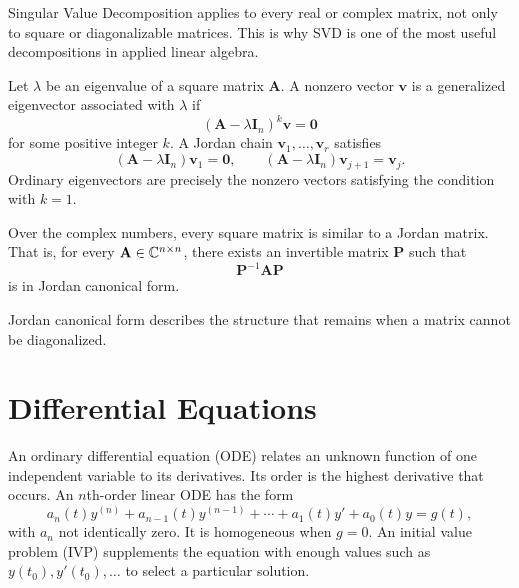     \begin{remark}
        Singular Value Decomposition applies to every real or complex matrix,
        not only to square or diagonalizable matrices. This is why SVD is one
        of the most useful decompositions in applied linear algebra.
    \end{remark}


    \begin{definition}
        Let $\lambda$ be an eigenvalue of a square matrix $\mathbf{A}$. A
        nonzero vector $\mathbf{v}$ is a generalized eigenvector associated
        with $\lambda$ if
        \[
            (\mathbf{A}-\lambda\mathbf{I}_n)^k\mathbf{v}
            =
            \mathbf{0}
        \]
        for some positive integer $k$. A Jordan chain
        $\mathbf{v}_1,\dots,\mathbf{v}_r$ satisfies
        \[
            (\mathbf{A}-\lambda\mathbf{I}_n)\mathbf{v}_1=\mathbf{0},
            \qquad
            (\mathbf{A}-\lambda\mathbf{I}_n)\mathbf{v}_{j+1}
            =
            \mathbf{v}_j.
        \]
        Ordinary eigenvectors are precisely the nonzero vectors satisfying the
        condition with $k=1$.
    \end{definition}

    \begin{theorem}
        Over the complex numbers, every square matrix is similar to a Jordan
        matrix. That is, for every $\mathbf{A}\in\mathbb{C}^{n\times n}$, there exists
        an invertible matrix $\mathbf{P}$ such that
        \[
            \mathbf{P}^{-1}\mathbf{A}\mathbf{P}
        \]
        is in Jordan canonical form.
    \end{theorem}

    \begin{remark}
        Jordan canonical form describes the structure that remains when a matrix
        cannot be diagonalized.
    \end{remark}

    \chapter{Differential Equations}



    \begin{definition}
        An ordinary differential equation (ODE) relates an unknown function of
        one independent variable to its derivatives. Its order is the highest
        derivative that occurs. An $n$th-order linear ODE has the form
        \[
            a_n(t)y^{(n)}+a_{n-1}(t)y^{(n-1)}+\cdots+a_1(t)y'+a_0(t)y=g(t),
        \]
        with $a_n$ not identically zero. It is homogeneous when $g=0$.
        An initial value problem (IVP) supplements the equation with enough
        values such as $y(t_0),y'(t_0),\dots$ to select a particular solution.
    \end{definition}

